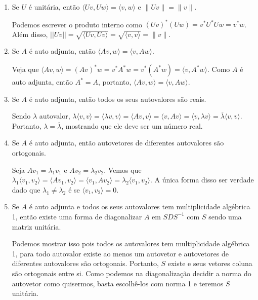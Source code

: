 \documentclass[11pt, a4paper]{article}
\begin{document}
\begin{enumerate}
    \item Se \(U\) é unitária, então \(\langle Uv,Uw\rangle = \langle v,w \rangle\) e \(\|Uv\|=\|v\|\).

    Podemos escrever o produto interno como \((Uv)^*(Uw)=v^*U^*Uw=v^*w\). Além disso, \(||Uv||=\sqrt{\langle Uv,Uv\rangle}=\sqrt{\langle v,v\rangle}=\|v\|\).

    \item Se \(A\) é auto adjunta, então \(\langle Av,w\rangle = \langle v,Aw \rangle\).

    Veja que \(\langle Av,w\rangle=(Av)^*w=v^*A^*w=v^*(A^*w)=\langle v,A^*w\rangle\). Como \(A\) é auto adjunta, então \(A^*=A\), portanto, \(\langle Av,w\rangle=\langle v,Aw\rangle\).

    \item Se \(A\) é auto adjunta, então todos os seus autovalores são reais.

    Sendo \(\lambda\) autovalor, \(\lambda \langle v,v \rangle = \langle\lambda v,v\rangle= \langle Av,v\rangle= \langle v,Av \rangle = \langle v, \lambda v \rangle = \overline{\lambda} \langle v,v \rangle\). Portanto, \(\lambda = \overline{\lambda}\), mostrando que ele deve ser um número real.

    \item Se \(A\) é auto adjunta, então autovetores de diferentes autovalores são ortogonais.

    Seja \(Av_1=\lambda_1 v_1\) e \(Av_2 = \lambda_2v_2\). Vemos que \(\lambda_1\langle v_1,v_2\rangle=\langle Av_1,v_2\rangle=\langle v_1,Av_2\rangle=\lambda_2\langle v_1,v_2\rangle\). A única forma disso ser verdade dado que \(\lambda_1 \ne \lambda_2\) é se \(\langle v_1,v_2\rangle = 0\).

    \item Se \(A\) é auto adjunta e todos os seus autovalores tem multiplicidade algébrica 1, então existe uma forma de diagonalizar \(A\) em \(SDS^{-1}\) com \(S\) sendo uma matriz unitária.

    Podemos mostrar isso pois todos os autovalores tem multiplicidade algébrica 1, para todo autovalor existe ao menos um autovetor e autovetores de diferentes autovalores são ortogonais. Portanto, \(S\) existe e seus vetores coluna são ortogonais entre si. Como podemos na diagonalização decidir a norma do autovetor como quisermos, basta escolhê-los com norma 1 e teremos \(S\) unitária.
\end{enumerate}
\end{document}
